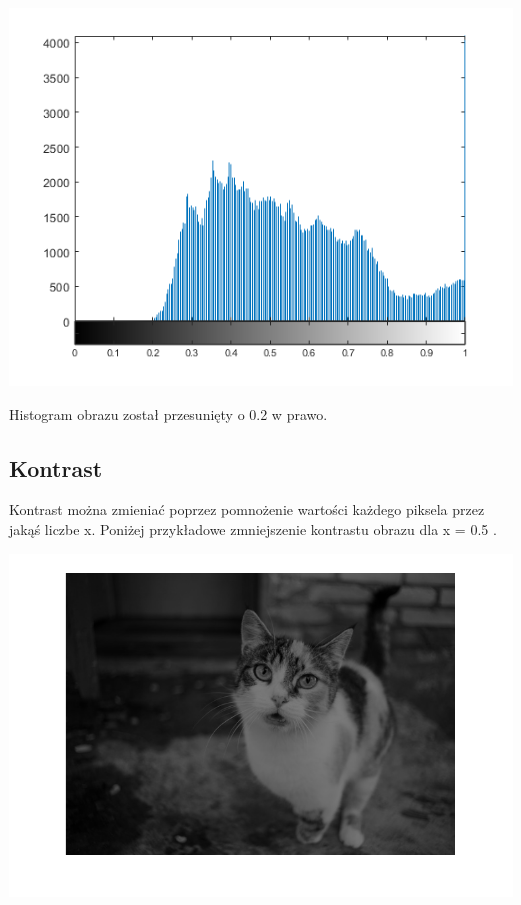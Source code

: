\documentclass{article}
\begin{document}
	\begin{center}
		\includegraphics[width=\linewidth]{../../lab02/cat_bright_hist.png}
		\label{fig:cat_bright_hist}
	\end{center}
	Histogram obrazu został przesunięty o 0.2 w prawo.
	
	
	\subsection{Kontrast}
	Kontrast można zmieniać poprzez pomnożenie wartości każdego piksela przez jakąś liczbe x. Poniżej przykładowe zmniejszenie kontrastu obrazu dla x = 0.5 .
	
	\begin{center}
		\includegraphics[width=\linewidth]{../../lab02/cat_contrast.png}
		\label{fig:cat_contrast}
	\end{center}
	
\end{document}
